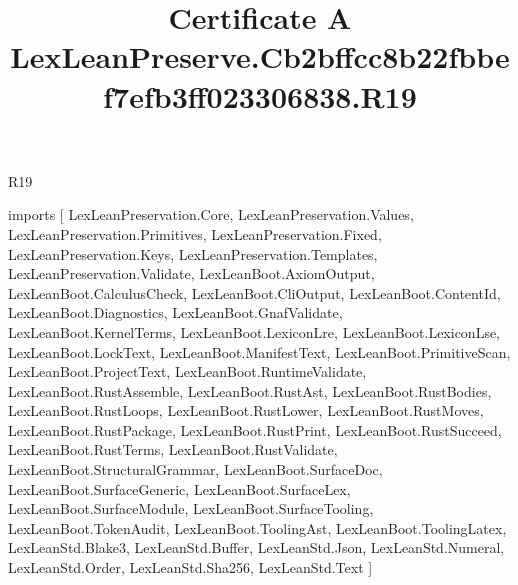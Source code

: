 \begin{lexlean}{R19}
\title{Certificate A LexLeanPreserve.Cb2bffcc8b22fbbef7efb3ff023306838.R19}
\begin{coremodule}
imports [
  LexLeanPreservation.Core,
  LexLeanPreservation.Values,
  LexLeanPreservation.Primitives,
  LexLeanPreservation.Fixed,
  LexLeanPreservation.Keys,
  LexLeanPreservation.Templates,
  LexLeanPreservation.Validate,
  LexLeanBoot.AxiomOutput,
  LexLeanBoot.CalculusCheck,
  LexLeanBoot.CliOutput,
  LexLeanBoot.ContentId,
  LexLeanBoot.Diagnostics,
  LexLeanBoot.GnafValidate,
  LexLeanBoot.KernelTerms,
  LexLeanBoot.LexiconLre,
  LexLeanBoot.LexiconLse,
  LexLeanBoot.LockText,
  LexLeanBoot.ManifestText,
  LexLeanBoot.PrimitiveScan,
  LexLeanBoot.ProjectText,
  LexLeanBoot.RuntimeValidate,
  LexLeanBoot.RustAssemble,
  LexLeanBoot.RustAst,
  LexLeanBoot.RustBodies,
  LexLeanBoot.RustLoops,
  LexLeanBoot.RustLower,
  LexLeanBoot.RustMoves,
  LexLeanBoot.RustPackage,
  LexLeanBoot.RustPrint,
  LexLeanBoot.RustSucceed,
  LexLeanBoot.RustTerms,
  LexLeanBoot.RustValidate,
  LexLeanBoot.StructuralGrammar,
  LexLeanBoot.SurfaceDoc,
  LexLeanBoot.SurfaceGeneric,
  LexLeanBoot.SurfaceLex,
  LexLeanBoot.SurfaceModule,
  LexLeanBoot.SurfaceTooling,
  LexLeanBoot.TokenAudit,
  LexLeanBoot.ToolingAst,
  LexLeanBoot.ToolingLatex,
  LexLeanStd.Blake3,
  LexLeanStd.Buffer,
  LexLeanStd.Json,
  LexLeanStd.Numeral,
  LexLeanStd.Order,
  LexLeanStd.Sha256,
  LexLeanStd.Text
]


\end{coremodule}
\end{lexlean}
